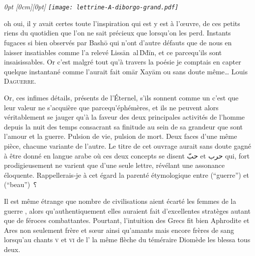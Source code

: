 
\section*{}
\thispagestyle{empty}
{
  \em\small
  0pt \textwidth
  0pt                \textwidth
  \noindent{}\raisebox{-\height+0.565cm}[0cm][0pt]{
    \hspace{-1.7cm}\texttt{[image: lettrine-A-diborgo-grand.pdf]}%
  }%
  oh oui, il y avait certes toute l’inspiration qui est y est à l’œuvre, de ces petits riens du quotidien que l’on ne sait précieux que lorsqu’on les perd. Instants fugaces si bien observés par Bashō qui n’ont d’autre défauts que de nous en laisser insatiables comme l’a relevé Lissān~al\,Ḋḋīn, et ce parcequ’ils sont insaisissables. Or c’est malgré tout  qu’à travers la poésie je comptais en capter quelque instantané comme l’aurait fait omār Xayām ou sans doute même… Louis \textsc{Daguerre}.

  Or, ces infimes détails, présents de l’Éternel, s’ils sonnent comme un  c’est  que leur valeur ne s’acquière que parcequ’éphémères, et ils ne peuvent alors véritablement se jauger qu’à la faveur des deux principales activités de l’homme depuis la nuit des temps consacrant sa finitude au sein de sa grandeur que sont l’amour et la guerre. Pulsion de vie, pulsion de mort. Deux faces d’une même pièce, chacune variante de l’autre. Le titre de cet ouvrage aurait sans doute gagné à être donné en langue arabe où ces deux concepts se disent  \textarabic{حبّ} et  \textarabic{حرب} qui, fort prodigieusement ne varient que d’une seule lettre, révélant une assonance éloquente. Rappellerais-je à cet égard la parenté étymologique entre  (\enquote{guerre}) et  (\enquote{beau}) ⸮

   Il est même étrange que nombre de civilisations aient écarté les femmes de la guerre , alors qu’authentiquement elles auraient fait d’excellentes stratèges autant que de féroces combattantes. Pourtant, l’intuition des Grecs fit bien Aphrodite et Ares non seulement frère et sœur ainsi qu’amants mais encore frères de sang lorsqu’au chants \textsc{v} et \textsc{vi} de l’ la même flèche du téméraire Diomède les blessa tous deux.

}
